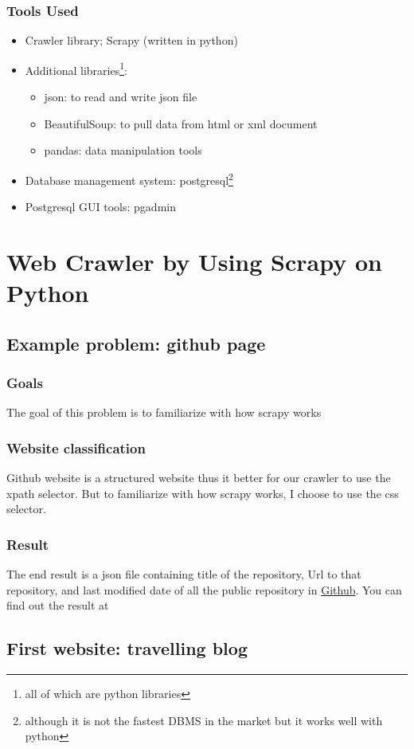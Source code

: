 \documentclass[11pt,a4paper]{report}
\begin{document}
\subsection{Tools Used}
\begin{itemize}
	\item Crawler library; Scrapy (written in python)
	\item Additional libraries\footnote{all of which are python libraries}:
	\begin{itemize}
		\item json: to read and write json file
		\item BeautifulSoup: to pull data from html or xml document
		\item pandas: data manipulation tools
	\end{itemize}
	\item Database management system: postgresql\footnote{although it is not the fastest DBMS in the market but it works well with python} 
	\item Postgresql GUI tools: pgadmin
\end{itemize} 
\chapter{Web Crawler by Using Scrapy on Python}
\newpage
\section{Example problem: github page}
	\subsection{Goals}
	The goal of this problem is to familiarize with how scrapy works
	\subsection{Website classification}
	Github website is a structured website thus it better for our crawler to use the xpath selector. But to familiarize with how scrapy works, I choose to use the css selector.
	\subsection{Result}
	The end result is a json file containing title of the repository, Url to that repository, and last modified date of all the public repository in \href{https://github.com/vietanhdev?tab=repositories}{Github}. You can find out the result at
\section{First website: travelling blog}
\end{document}

